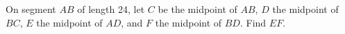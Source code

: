 On segment $AB$ of length 24, let $C$ be the midpoint of $AB$, $D$ the midpoint of $BC$, $E$ the midpoint of $AD$, and $F$ the midpoint of $BD$. Find $EF$.
